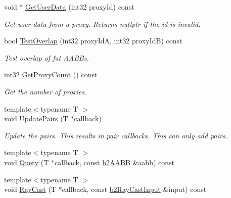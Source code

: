\begin{DoxyCompactItemize}
void $\ast$ \mbox{\hyperlink{classb2BroadPhase_a3b85893e3cf18b43087cb96b0b9076d1}{Get\+User\+Data}} (int32 proxy\+Id) const
\begin{DoxyCompactList}\small\item\em Get user data from a proxy. Returns nullptr if the id is invalid. \end{DoxyCompactList}\item 
\mbox{\label{classb2BroadPhase_a263cc21e2a3f1f892c20b048eca3cad6}} 
bool \mbox{\hyperlink{classb2BroadPhase_a263cc21e2a3f1f892c20b048eca3cad6}{Test\+Overlap}} (int32 proxy\+IdA, int32 proxy\+IdB) const
\begin{DoxyCompactList}\small\item\em Test overlap of fat A\+A\+B\+Bs. \end{DoxyCompactList}\item 
\mbox{\label{classb2BroadPhase_ab7a8c31223d8404b79f6c57e8fc69837}} 
int32 \mbox{\hyperlink{classb2BroadPhase_ab7a8c31223d8404b79f6c57e8fc69837}{Get\+Proxy\+Count}} () const
\begin{DoxyCompactList}\small\item\em Get the number of proxies. \end{DoxyCompactList}\item 
\mbox{\label{classb2BroadPhase_a0a1acd693466b997700242ae00784c20}} 
{\footnotesize template$<$typename T $>$ }\\void \mbox{\hyperlink{classb2BroadPhase_a0a1acd693466b997700242ae00784c20}{Update\+Pairs}} (T $\ast$callback)
\begin{DoxyCompactList}\small\item\em Update the pairs. This results in pair callbacks. This can only add pairs. \end{DoxyCompactList}\item 
{\footnotesize template$<$typename T $>$ }\\void \mbox{\hyperlink{classb2BroadPhase_a187586ea98b9d16e5ef6e12fa31f8de2}{Query}} (T $\ast$callback, const \mbox{\hyperlink{structb2AABB}{b2\+A\+A\+BB}} \&aabb) const
\item 
{\footnotesize template$<$typename T $>$ }\\void \mbox{\hyperlink{classb2BroadPhase_ae65392ea91c7d0839ed5312f78b2837a}{Ray\+Cast}} (T $\ast$callback, const \mbox{\hyperlink{structb2RayCastInput}{b2\+Ray\+Cast\+Input}} \&input) const

\end{DoxyCompactItemize}
